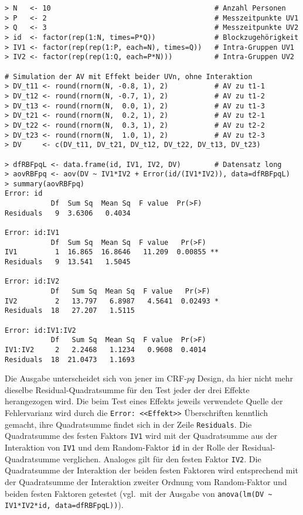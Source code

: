 \begin{lstlisting}
> N   <- 10                                       # Anzahl Personen
> P   <- 2                                        # Messzeitpunkte UV1
> Q   <- 3                                        # Messzeitpunkte UV2
> id  <- factor(rep(1:N, times=P*Q))              # Blockzugehörigkeit
> IV1 <- factor(rep(rep(1:P, each=N), times=Q))   # Intra-Gruppen UV1
> IV2 <- factor(rep(rep(1:Q, each=P*N)))          # Intra-Gruppen UV2

# Simulation der AV mit Effekt beider UVn, ohne Interaktion
> DV_t11 <- round(rnorm(N, -0.8, 1), 2)           # AV zu t1-1
> DV_t12 <- round(rnorm(N, -0.7, 1), 2)           # AV zu t1-2
> DV_t13 <- round(rnorm(N,  0.0, 1), 2)           # AV zu t1-3
> DV_t21 <- round(rnorm(N,  0.2, 1), 2)           # AV zu t2-1
> DV_t22 <- round(rnorm(N,  0.3, 1), 2)           # AV zu t2-2
> DV_t23 <- round(rnorm(N,  1.0, 1), 2)           # AV zu t2-3
> DV     <- c(DV_t11, DV_t21, DV_t12, DV_t22, DV_t13, DV_t23)

> dfRBFpqL <- data.frame(id, IV1, IV2, DV)        # Datensatz long
> aovRBFpq <- aov(DV ~ IV1*IV2 + Error(id/(IV1*IV2)), data=dfRBFpqL)
> summary(aovRBFpq)
Error: id
           Df  Sum Sq  Mean Sq  F value  Pr(>F)
Residuals   9  3.6306   0.4034

Error: id:IV1
           Df  Sum Sq  Mean Sq  F value   Pr(>F)
IV1         1  16.865  16.8646   11.209  0.00855 **
Residuals   9  13.541   1.5045

Error: id:IV2
           Df   Sum Sq  Mean Sq  F value   Pr(>F)
IV2         2   13.797   6.8987   4.5641  0.02493 *
Residuals  18   27.207   1.5115

Error: id:IV1:IV2
           Df   Sum Sq  Mean Sq  F value  Pr(>F)
IV1:IV2     2   2.2468   1.1234   0.9608  0.4014
Residuals  18  21.0473   1.1693
\end{lstlisting}

Die Ausgabe unterscheidet sich von jener im CRF-$pq$ Design, da hier nicht mehr dieselbe Residual-Quadratsumme für den Test jeder der drei Effekte herangezogen wird. Die beim Test eines Effekts jeweils verwendete Quelle der Fehlervarianz wird durch die \lstinline!Error: <<Effekt>>! Überschriften kenntlich gemacht, ihre Quadratsumme findet sich in der Zeile \lstinline!Residuals!. Die Quadratsumme des festen Faktors \lstinline!IV1! wird mit der Quadratsumme aus der Interaktion von \lstinline!IV1! und dem Random-Faktor \lstinline!id! in der Rolle der Residual-Quadratsumme verglichen. Analoges gilt für den festen Faktor \lstinline!IV2!. Die Quadratsumme der Interaktion der beiden festen Faktoren wird entsprechend mit der Quadratsumme der Interaktion zweiter Ordnung vom Random-Faktor und beiden festen Faktoren getestet (vgl.\ mit der Ausgabe von \lstinline!anova(lm(DV ~ IV1*IV2*id, data=dfRBFpqL))!).

